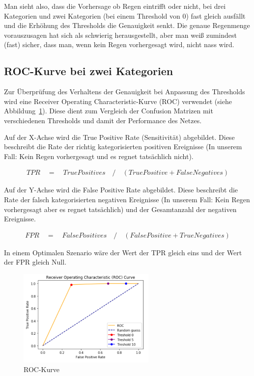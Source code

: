 Man sieht also, dass die Vorhersage ob Regen eintrifft oder nicht, bei drei Kategorien und zwei Kategorien (bei einem Threshold von 0) fast gleich ausfällt und  die Erhöhung des Thresholds die Genauigkeit senkt. Die genaue Regenmenge vorauszusagen hat sich als schwierig herausgestellt, aber man weiß zumindest (fast) sicher, dass man, wenn kein Regen vorhergesagt wird, nicht nass wird.

\subsection{ROC-Kurve bei zwei Kategorien}
Zur Überprüfung des Verhaltens der Genauigkeit bei Anpassung des Thresholds wird eine Receiver Operating Characteristic-Kurve (ROC) verwendet (siehe Abbildung~\ref{roc}). Diese dient zum Vergleich der Confusion Matrizen mit verschiedenen Thresholds und damit der Performance des Netzes.

Auf der X-Achse wird die True Positive Rate (Sensitivität) abgebildet. Diese beschreibt die Rate der richtig kategorisierten positiven Ereignisse (In unserem Fall: Kein Regen vorhergesagt und es regnet tatsächlich nicht).

\begin{align*}
  TPR \quad	 {=} \quad True Positives \quad / \quad(True Positive + False Negatives)
\end{align*}

Auf der Y-Achse wird die False Positive Rate abgebildet. Diese beschreibt die Rate der falsch kategorisierten negativen Ereignisse (In unserem Fall: Kein Regen vorhergesagt aber es regnet tatsächlich) und der Gesamtanzahl der negativen Ereignisse.

\begin{align*}
  FPR \quad	 {=} \quad False Positives \quad / \quad(False Positive + True Negatives)
\end{align*}

In einem Optimalen Szenario wäre der Wert der TPR gleich eins und der Wert der FPR gleich Null. 


\begin{figure}[H]
	\centering
	\includegraphics[width=0.6\textwidth]{pics/roc.PNG}
	\caption{ROC-Kurve}
	\label{roc}
\end{figure}

